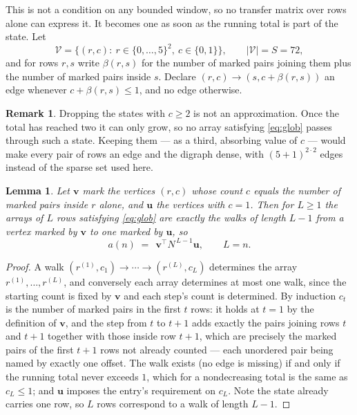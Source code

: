 \documentclass[11pt,a4paper]{article}
\theoremstyle{plain}
\newtheorem{lemma}[theorem]{Lemma}
\theoremstyle{definition}
\newtheorem{remark}[theorem]{Remark}
\begin{document}
This is not a condition on any bounded window, so no transfer matrix over rows alone can
express it. It becomes one as soon as the running total is part of the state. Let
\[
\mathcal V=\bigl\{(r,c):\ r\in\{0,\dots,5\}^{2},\ c\in\{0,1\}\bigr\},
\qquad |\mathcal V|=S=72,
\]
and for rows $r,s$ write $\beta(r,s)$ for the number of marked pairs joining them plus the
number of marked pairs inside $s$. Declare $(r,c)\to(s,c+\beta(r,s))$ an edge whenever
$c+\beta(r,s)\le1$, and no edge otherwise.

\begin{remark}
Dropping the states with $c\ge2$ is not an approximation. Once the total has reached two it
can only grow, so no array satisfying \eqref{eq:glob} passes through such a state. Keeping
them --- as a third, absorbing value of $c$ --- would make every pair of rows an edge and
the digraph dense, with $(5+1)^{2\cdot2}$ edges instead of the sparse set used here.
\end{remark}

\begin{lemma}\label{lem:walk}
Let $\mathbf{v}$ mark the vertices $(r,c)$ whose count $c$ equals the number of marked pairs
inside $r$ alone, and $\mathbf{u}$ the vertices with $c=1$. Then for $L\ge1$ the arrays
of $L$ rows satisfying \eqref{eq:glob} are exactly the walks of length $L-1$ from a
vertex marked by $\mathbf{v}$ to one marked by $\mathbf{u}$, so
\[
a(n)\;=\;\,\mathbf{v}^{\!\top}N^{\,L-1}\mathbf{u},\qquad L=n .
\]
\end{lemma}

\begin{proof}
A walk $(r^{(1)},c_1)\to\cdots\to(r^{(L)},c_L)$ determines the array
$r^{(1)},\dots,r^{(L)}$, and conversely each array determines at most one walk, since the
starting count is fixed by $\mathbf{v}$ and each step's count is determined. By induction
$c_t$ is the number of marked pairs in the first $t$ rows: it holds at $t=1$ by the
definition of $\mathbf{v}$, and the step from $t$ to $t+1$ adds exactly the pairs joining
rows $t$ and $t+1$ together with those inside row $t+1$, which are precisely the marked
pairs of the first $t+1$ rows not already counted --- each unordered pair being named by
exactly one offset. The walk exists (no edge is missing) if and only if the running total
never exceeds $1$, which for a nondecreasing total is the same as $c_L\le1$; and
$\mathbf{u}$ imposes the entry's requirement on $c_L$. Note the state already carries one
row, so $L$ rows correspond to a walk of length $L-1$.
\end{proof}
\end{document}
